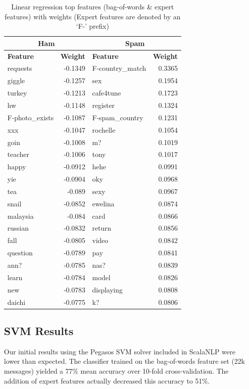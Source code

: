 \documentclass[preprint]{acm_proc_article-sp}
\begin{document}
\begin{table}
\small
\begin{tabular}{l|r||l|r}
\multicolumn{2}{c}{\textbf{Ham}} & 
\multicolumn{2}{c}{\textbf{Spam}} \\
\hline
\textbf{Feature} & \textbf{Weight} & \textbf{Feature} & \textbf{Weight} \\
\hline
requests & -0.1349 & F-country\_match & 0.3365\\
giggle & -0.1257 & sex & 0.1954\\
turkey & -0.1213 & cafe4tune & 0.1723\\
hw & -0.1148 & register & 0.1324\\
F-photo\_exists & -0.1087 & F-spam\_country & 0.1231\\
xxx & -0.1047 & rochelle & 0.1054\\
goin & -0.1008 & m? & 0.1019\\
teacher & -0.1006 & tony & 0.1017\\
happy & -0.0912 & hehe & 0.0991\\
yie & -0.0904 & oky & 0.0968\\
tea & -0.089 & sexy & 0.0967\\
snail & -0.0852 & ewelina & 0.0874\\
malaysia & -0.084 & card & 0.0866\\
russian & -0.0832 & return & 0.0856\\
fall & -0.0805 & video & 0.0842\\
question & -0.0789 & pay & 0.0841\\
ann? & -0.0785 & nas? & 0.0839\\
learn & -0.0784 & model & 0.0826\\
new & -0.0783 & displaying & 0.0808\\
daichi & -0.0775 & k?  & 0.0806\\
\end{tabular}
\caption{Linear regression top features (bag-of-words \& expert features) with weights (Expert features
are denoted by an `F-' prefix)}
\label{tab:lrfeatse}
\end{table}


\subsection{SVM Results}
Our initial results using the Pegasos SVM solver included in ScalaNLP were lower than expected. The 
classifier trained on the bag-of-words feature set (22k messages) yielded a 77\% mean accuracy 
over 10-fold cross-validation. The addition of expert features actually decreased this accuracy to 
51\%. 
\end{document}
